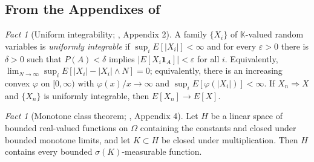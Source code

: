 \documentclass[11pt,a4paper]{article}
\theoremstyle{plain}
\theoremstyle{definition}
\theoremstyle{remark}
\newtheorem{fact}[theorem]{Fact}
\newcommand{\K}{\mathbb{K}}
\newcommand{\one}{\mathbf{1}}
\DeclareMathOperator*{\wto}{\Rightarrow}
\newcommand{\EK}{\cite{EK86}}
\begin{document}
\subsection{From the Appendixes of \EK}
\label{ssec:appendix}

\begin{fact}[Uniform integrability; \EK, Appendix 2]
  \label{fact:ui}
  A family $\{X_i\}$ of $\K$-valued random variables is \emph{uniformly
  integrable} if $\sup_i E[|X_i|] < \infty$ and for every $\varepsilon > 0$ there
  is $\delta > 0$ such that $P(A) < \delta$ implies
  $|E[X_i \one_A]| < \varepsilon$ for all $i$.  Equivalently,
  $\lim_{N \to \infty} \sup_i E[|X_i| - |X_i| \wedge N] = 0$; equivalently, there
  is an increasing convex $\varphi$ on $[0,\infty)$ with
  $\varphi(x)/x \to \infty$ and $\sup_i E[\varphi(|X_i|)] < \infty$.  If
  $X_n \wto X$ and $\{X_n\}$ is uniformly integrable, then
  $E[X_n] \to E[X]$.
\end{fact}

\begin{fact}[Monotone class theorem; \EK, Appendix 4]
  \label{fact:monotoneclass}
  Let $H$ be a linear space of bounded real-valued functions on $\Omega$
  containing the constants and closed under bounded monotone limits, and let
  $K \subset H$ be closed under multiplication.  Then $H$ contains every bounded
  $\sigma(K)$-measurable function.
\end{fact}
\end{document}
